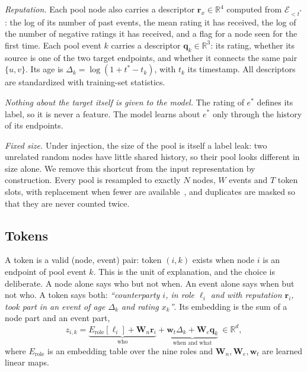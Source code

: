 \documentclass[pdflatex,sn-basic]{sn-jnl}
\newcommand{\Ecal}{\mathcal{E}}
\newcommand{\R}{\mathbb{R}}
\theoremstyle{definition}
\theoremstyle{plain}
\begin{document}
\emph{Reputation.} Each pool node also carries a descriptor
$\mathbf{r}_x\in\R^4$ computed from $\Ecal_{<t^\ast}$: the log of its number
of past events, the mean rating it has received, the log of the number of
negative ratings it has received, and a flag for a node seen for the first
time. Each pool event $k$ carries a descriptor $\mathbf{q}_k\in\R^3$: its
rating, whether its source is one of the two target endpoints, and whether it
connects the same pair $\{u,v\}$. Its age is
$\Delta_k=\log(1+t^\ast-t_k)$, with $t_k$ its timestamp. All descriptors
are standardized with training-set statistics.

\emph{Nothing about the target itself is given to the model.} The rating of
$e^\ast$ defines its label, so it is never a feature. The model learns about
$e^\ast$ only through the history of its endpoints.

\emph{Fixed size.} Under injection, the size of the pool is itself a label
leak: two unrelated random nodes have little shared history, so their pool
looks different in size alone. We remove this shortcut from the input
representation by construction. Every
pool is resampled to exactly $N$ nodes, $W$ events and $T$ token slots, with
replacement when fewer are available~\cite{graphsage}, and duplicates are
masked so that they are never counted twice.

\subsection{Tokens}
A token is a valid (node, event) pair: token $(i,k)$ exists when node $i$ is
an endpoint of pool event $k$. This is the unit of explanation, and the choice
is deliberate. A node alone says who but not when. An event alone says when but
not who. A token says both: \emph{``counterparty $i$, in role $\ell_i$ and with
reputation $\mathbf{r}_i$, took part in an event of age $\Delta_k$ and rating
$x_k$''}. Its embedding is the sum of a node part and an event part,
\begin{equation}
z_{i,k}=\underbrace{E_{\text{role}}[\ell_i]+\mathbf{W}_n\mathbf{r}_i}_{\text{who}}
+\underbrace{\mathbf{w}_t\Delta_k+\mathbf{W}_e\mathbf{q}_k}_{\text{when and what}}
\ \in\R^{d},
\label{eq:token}
\end{equation}
where $E_{\text{role}}$ is an embedding table over the nine roles and
$\mathbf{W}_n,\mathbf{W}_e,\mathbf{w}_t$ are learned linear maps.
\end{document}
